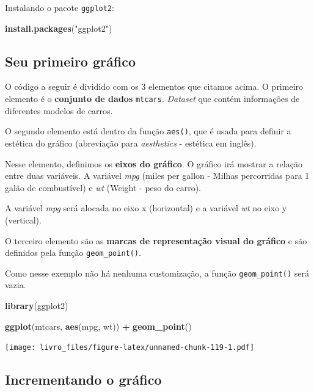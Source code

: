 \documentclass[
]{book}
\newenvironment{Shaded}{\begin{snugshade}}{\end{snugshade}}
\newcommand{\KeywordTok}[1]{\textcolor[rgb]{0.13,0.29,0.53}{\textbf{#1}}}
\newcommand{\NormalTok}[1]{#1}
\newcommand{\OperatorTok}[1]{\textcolor[rgb]{0.81,0.36,0.00}{\textbf{#1}}}
\newcommand{\StringTok}[1]{\textcolor[rgb]{0.31,0.60,0.02}{#1}}
\begin{document}
Instalando o pacote \texttt{ggplot2}:

\begin{Shaded}
\begin{Highlighting}[]
\KeywordTok{install.packages}\NormalTok{(}\StringTok{"ggplot2"}\NormalTok{)}
\end{Highlighting}
\end{Shaded}

\hypertarget{seu-primeiro-gruxe1fico}{%
\subsection{Seu primeiro gráfico}\label{seu-primeiro-gruxe1fico}}

O código a seguir é dividido com os 3 elementos que citamos acima. O
primeiro elemento é o \textbf{conjunto de dados} \texttt{mtcars}.
\emph{Dataset} que contém informações de diferentes modelos de carros.

O segundo elemento está dentro da função \texttt{aes()}, que é usada
para definir a estética do gráfico (abreviação para \emph{aesthetics} -
estética em inglês).

Nesse elemento, definimos os \textbf{eixos do gráfico}. O gráfico irá
mostrar a relação entre duas variáveis. A variável \emph{mpg} (miles per
gallon - Milhas percorridas para 1 galão de combustível) e \emph{wt}
(Weight - peso do carro).

A variável \emph{mpg} será alocada no eixo x (horizontal) e a variável
\emph{wt} no eixo y (vertical).

O terceiro elemento são as \textbf{marcas de representação visual do
gráfico} e são definidos pela função \texttt{geom\_point()}.

Como nesse exemplo não há nenhuma customização, a função
\texttt{geom\_point()} será vazia.

\begin{Shaded}
\begin{Highlighting}[]
\KeywordTok{library}\NormalTok{(ggplot2)}

\KeywordTok{ggplot}\NormalTok{(mtcars, }\KeywordTok{aes}\NormalTok{(mpg, wt)) }\OperatorTok{+}
\StringTok{  }\KeywordTok{geom_point}\NormalTok{()}
\end{Highlighting}
\end{Shaded}

\texttt{[image: livro\_files/figure-latex/unnamed-chunk-119-1.pdf]}

\hypertarget{incrementando-o-gruxe1fico}{%
\subsection{Incrementando o gráfico}\label{incrementando-o-gruxe1fico}}
\end{document}
